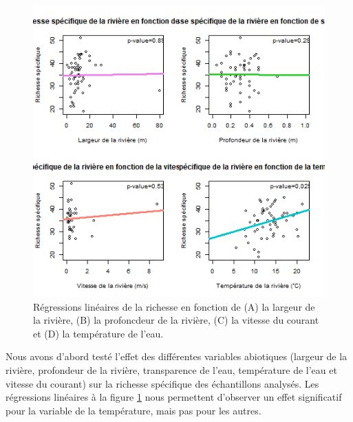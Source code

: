 \documentclass[9pt,twocolumn,twoside,]{pnas-new}
\begin{document}
\begin{figure}
\centering
\includegraphics{regression_richesse.png}
\caption{Régressions linéaires de la richesse en fonction de (A) la
largeur de la rivière, (B) la profoncdeur de la rivière, (C) la vitesse
du courant et (D) la température de l'eau.
\label{fig:regression_richesse}}
\end{figure}

Nous avons d'abord testé l'effet des différentes variables abiotiques
(largeur de la rivière, profondeur de la rivière, transparence de l'eau,
température de l'eau et vitesse du courant) sur la richesse spécifique
des échantillons analysés. Les régressions linéaires à la figure
\ref{fig:regression_richesse} nous permettent d'observer un effet
significatif pour la variable de la température, mais pas pour les
autres.
\end{document}
